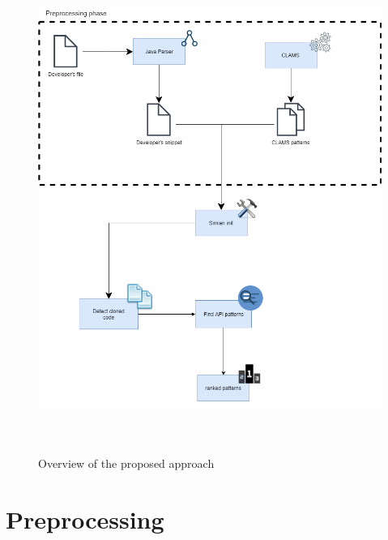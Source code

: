 \begin{figure}[!h]
\includegraphics[width=14cm,height=16cm,keepaspectratio]{images/simian.png}
\centering
\caption{Overview of the proposed approach}
\label{Figure 5}
\end{figure}

\section{Preprocessing}

